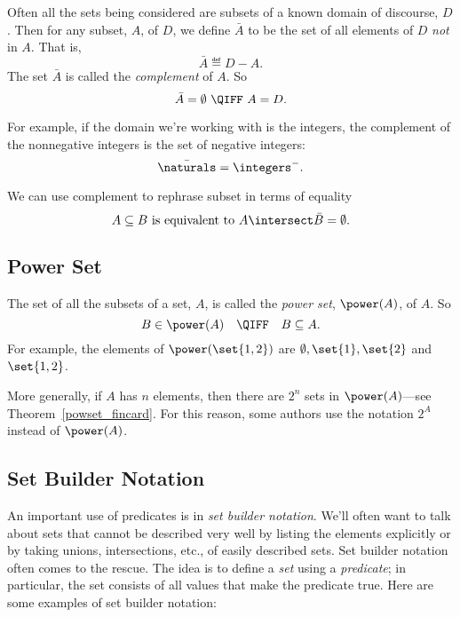 Often all the sets being considered are subsets of a known domain
of discourse, $D$.  Then for any subset, $A$, of $D$, we define
$\bar{A}$ to be the set of all elements of $D$ \textit{not} in $A$.
That is,
\[
\bar{A} \eqdef D-A.
\]
The set $\bar{A}$ is called the \emph{complement}
  of $A$.  So
\[
\bar{A} = \emptyset\ \QIFF\ A = D.
\]

For example, if the domain we're working with is the integers, the
complement of the nonnegative integers is the set of negative integers:
\[
\bar{\naturals} = \integers^-.
\]

We can use complement to rephrase subset in terms of equality
\[
A \subseteq B \text{  is equivalent to  } A \intersect \bar{B} = \emptyset.
\]

\iffalse
It can be helpful to rephrase properties of sets using complements.  For
example, two sets, $A$ and $B$, are said to be \term{disjoint} iff they
have no elements in common, that is, $A \intersect B = \emptyset$.  This
is the same as saying that $A$ is a subset of the complement of $B$, that
is, $A \subseteq \bar{B}$.
\fi

\subsection{Power Set}

The set of all the subsets of a set, $A$, is called the \emph{power
  set},%
$\power(A)$, of $A$.  So
\[
B \in \power(A)\quad  \QIFF\quad  B \subseteq A.
\]
For example, the elements of $\power(\set{1, 2})$ are $\emptyset,
\set{1}, \set{2}$ and $\set{1, 2}$.

More generally, if $A$ has $n$ elements, then there are $2^n$ sets in
$\power(A)$---see Theorem~\ref{powset_fincard}.  For this reason,
some authors use the notation $2^A$ instead of $\power(A)$.

\subsection{Set Builder Notation}\label{set_builder_sec}

An important use of predicates is in%
\emph{set builder notation}.  We'll
often want to talk about sets that cannot be described very well by
listing the elements explicitly or by taking unions, intersections,
etc., of easily described sets.  Set builder notation often comes to the
rescue.  The idea is to define a \emph{set} using a \emph{predicate};
in particular, the set consists of all values that make the predicate
true.  Here are some examples of set builder notation:

